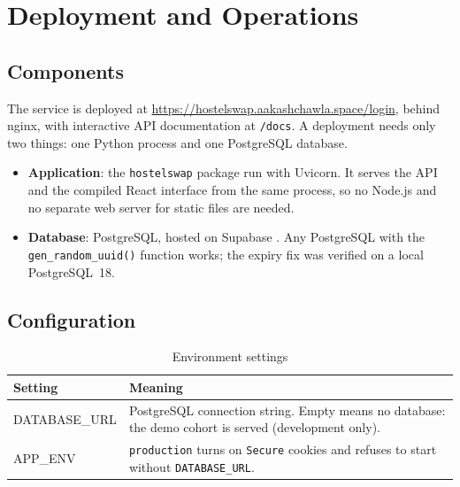 
\chapter{Deployment and Operations}
\label{ch:deployment}

\section{Components}

The service is deployed at
\url{https://hostelswap.aakashchawla.space/login}, behind nginx, with
interactive API documentation at \texttt{/docs}. A deployment needs only
two things: one Python process and one PostgreSQL database.

\begin{itemize}
  \item \textbf{Application}: the \texttt{hostelswap} package run with
  Uvicorn. It serves the API and the compiled React interface from the
  same process, so no Node.js and no separate web server for static
  files are needed.
  \item \textbf{Database}: PostgreSQL, hosted on Supabase
  \cite{supabase}. Any PostgreSQL with the \texttt{gen\_random\_uuid()}
  function works; the expiry fix was verified on a local PostgreSQL~18.
\end{itemize}

\section{Configuration}

\begin{table}[H]
\centering
\small
\begin{tabularx}{\textwidth}{>{\ttfamily\raggedright\arraybackslash}p{} L}
\toprule
\textrm{\textbf{Setting}} & \textbf{Meaning} \\
\midrule
DATABASE\_URL & PostgreSQL connection string. Empty means no database: the demo cohort is served (development only). \\
APP\_ENV & \texttt{production} turns on \texttt{Secure} cookies and refuses to start without \texttt{DATABASE\_URL}. \\
\bottomrule
\end{tabularx}
\caption{Environment settings}
\label{tab:env}
\end{table}

